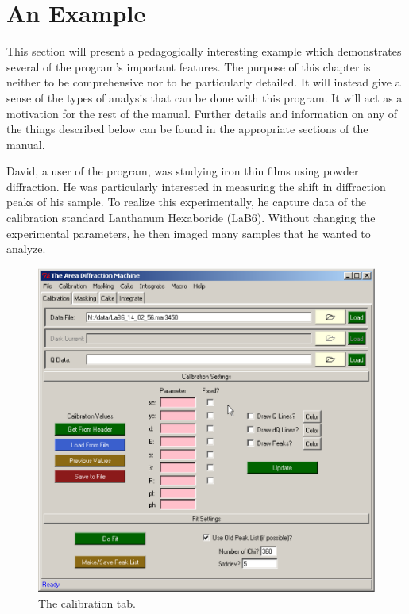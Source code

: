 \chapter{An Example}
This section will present a pedagogically interesting 
example which demonstrates several of the program's important
features.  The purpose of this chapter is neither to be 
comprehensive nor to be particularly detailed. It will instead 
give a sense of the types of analysis that can be done with 
this program. It will act as a motivation for the rest of the manual. 
Further details 
and information on any of the things described below can be found in 
the appropriate sections of the manual.

David, a user of the program, was studying iron thin films 
using powder diffraction. He was particularly interested in 
measuring the shift in diffraction peaks of his sample. To 
realize this experimentally, he capture data of the 
calibration standard Lanthanum Hexaboride (LaB6). 
Without changing the experimental parameters, he then imaged 
many samples that he wanted to analyze. 

\begin{figure}
    \centering
    \includegraphics[scale=.75]
    {figures/calibration_tab.eps}
    \caption{The calibration tab.}
    \label{calibration_tab_example}
\end{figure}

